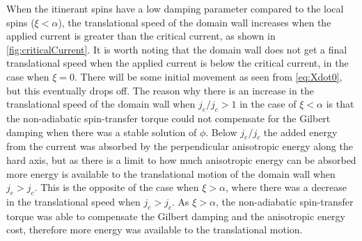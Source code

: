 \documentclass[12pt, a4paper]{article}		%
\numberwithin{equation}{section}
\begin{document}
When the itinerant spins have a low damping parameter compared to the local spins ($\xi<\alpha$), the translational speed of the domain wall increases when the applied current is greater than the critical current, as shown in \ref{fig:criticalCurrent}. It is worth noting that the domain wall does not get a final translational speed when the applied current is below the critical current, in the case when $\xi=0$. There will be some initial movement as seen from \eqref{eq:Xdot0}, but this eventually drops off. The reason why there is an increase in the translational speed of the domain wall when $j_e/j_c>1$ in the case of $\xi<\alpha$ is that the non-adiabatic spin-transfer torque could not compensate for the Gilbert damping when there was a stable solution of $\phi$. Below $j_e/j_c$ the added energy from the current was absorbed by the perpendicular anisotropic energy along the hard axis, but as there is a limit to how much anisotropic energy can be absorbed more energy is available to the translational motion of the domain wall when $j_e>j_c$. This is the opposite of the case when $\xi>\alpha$, where there was a decrease in the translational speed when $j_e>j_c$. As $\xi>\alpha$, the non-adiabatic spin-transfer torque was able to compensate the Gilbert damping and the anisotropic energy cost, therefore more energy was available to the translational motion.
\end{document}
